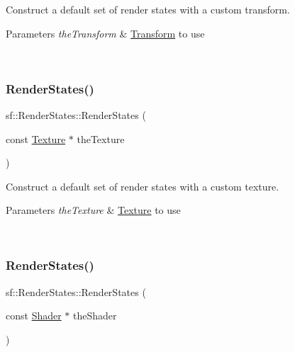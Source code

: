 Construct a default set of render states with a custom transform. 


\begin{DoxyParams}{Parameters}
{\em the\+Transform} & \mbox{\hyperlink{classsf_1_1_transform}{Transform}} to use \begin{DoxyVerb}\end{DoxyVerb}
 \\
\hline
\end{DoxyParams}
\mbox{\label{classsf_1_1_render_states_a8f4ca3be0e27dafea0c4ab8547439bb1}} 
\subsubsection{\texorpdfstring{RenderStates()}{RenderStates()}\hspace{0.1cm}{\footnotesize\ttfamily [4/6]}}
{\footnotesize\ttfamily sf\+::\+Render\+States\+::\+Render\+States (\begin{DoxyParamCaption}\item[{const \mbox{\hyperlink{classsf_1_1_texture}{Texture}} $\ast$}]{the\+Texture }\end{DoxyParamCaption})}



Construct a default set of render states with a custom texture. 


\begin{DoxyParams}{Parameters}
{\em the\+Texture} & \mbox{\hyperlink{classsf_1_1_texture}{Texture}} to use \begin{DoxyVerb}\end{DoxyVerb}
 \\
\hline
\end{DoxyParams}
\mbox{\label{classsf_1_1_render_states_a39f94233f464739d8d8522f3aefe97d0}} 
\subsubsection{\texorpdfstring{RenderStates()}{RenderStates()}\hspace{0.1cm}{\footnotesize\ttfamily [5/6]}}
{\footnotesize\ttfamily sf\+::\+Render\+States\+::\+Render\+States (\begin{DoxyParamCaption}\item[{const \mbox{\hyperlink{classsf_1_1_shader}{Shader}} $\ast$}]{the\+Shader }\end{DoxyParamCaption})}



